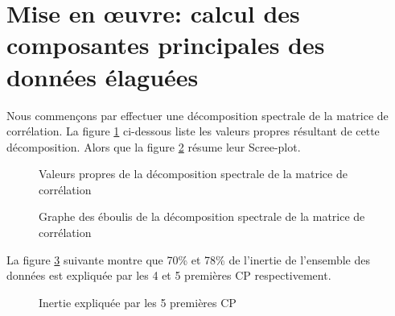 	\section{Mise en œuvre: calcul des composantes principales des données élaguées}
	Nous commençons par effectuer une décomposition spectrale de la matrice de corrélation. La figure \ref{fig:valpropres} ci-dessous liste les valeurs propres résultant de cette décomposition. Alors que la figure \ref{fig:scree} résume leur Scree-plot.
				\begin{figure}[H]
					    		\centering
					    		\caption{Valeurs propres de la décomposition spectrale de la matrice de corrélation}
					    		\label{fig:valpropres}
				\end{figure}
					\begin{figure}[H]
						    		\centering
						    		\caption{Graphe des éboulis de la décomposition spectrale de la matrice de corrélation}
						    		\label{fig:scree}
					\end{figure}
	La figure \ref{fig:inert} suivante montre que 70\% et 78\% de l'inertie de l'ensemble des données est expliquée par les 4 et 5 premières CP respectivement.
				\begin{figure}[H]
					    		\centering
					    		\caption{Inertie expliquée par les 5 premières CP}
					    		\label{fig:inert}
				\end{figure}

